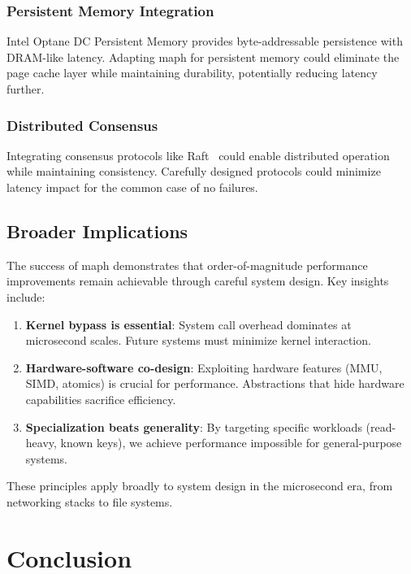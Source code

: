 \documentclass[11pt]{article}
\begin{document}
\subsubsection{Persistent Memory Integration}
Intel Optane DC Persistent Memory provides byte-addressable persistence with DRAM-like latency. Adapting maph for persistent memory could eliminate the page cache layer while maintaining durability, potentially reducing latency further.

\subsubsection{Distributed Consensus}
Integrating consensus protocols like Raft~\cite{raft} could enable distributed operation while maintaining consistency. Carefully designed protocols could minimize latency impact for the common case of no failures.

\subsection{Broader Implications}

The success of maph demonstrates that order-of-magnitude performance improvements remain achievable through careful system design. Key insights include:

\begin{enumerate}
\item \textbf{Kernel bypass is essential}: System call overhead dominates at microsecond scales. Future systems must minimize kernel interaction.

\item \textbf{Hardware-software co-design}: Exploiting hardware features (MMU, SIMD, atomics) is crucial for performance. Abstractions that hide hardware capabilities sacrifice efficiency.

\item \textbf{Specialization beats generality}: By targeting specific workloads (read-heavy, known keys), we achieve performance impossible for general-purpose systems.
\end{enumerate}

These principles apply broadly to system design in the microsecond era, from networking stacks to file systems.

\section{Conclusion}
\label{sec:conclusion}
\end{document}
